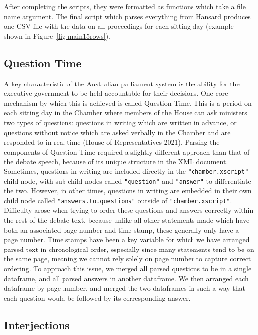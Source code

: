 \documentclass[
  letterpaper,
  DIV=11,
  numbers=noendperiod]{scrartcl}
\begin{document}
After completing the scripts, they were formatted as functions which
take a file name argument. The final script which parses everything from
Hansard produces one CSV file with the data on all proceedings for each
sitting day (example shown in Figure~\ref{fig-main15rows}).

\hypertarget{sec-qa}{%
\subsection{Question Time}\label{sec-qa}}

A key characteristic of the Australian parliament system is the ability
for the executive government to be held accountable for their decisions.
One core mechanism by which this is achieved is called Question Time.
This is a period on each sitting day in the Chamber where members of the
House can ask ministers two types of questions: questions in writing
which are written in advance, or questions without notice which are
asked verbally in the Chamber and are responded to in real time (House
of Representatives 2021). Parsing the components of Question Time
required a slightly different approach than that of the debate speech,
because of its unique structure in the XML document. Sometimes,
questions in writing are included directly in the
\texttt{"chamber.xscript"} child node, with sub-child nodes called
\texttt{"question"} and \texttt{"answer"} to differentiate the two.
However, in other times, questions in writing are embedded in their own
child node called \texttt{"answers.to.questions"} outside of
\texttt{"chamber.xscript"}. Difficulty arose when trying to order these
questions and answers correctly within the rest of the debate text,
because unlike all other statements made which have both an associated
page number and time stamp, these generally only have a page number.
Time stamps have been a key variable for which we have arranged parsed
text in chronological order, especially since many statements tend to be
on the same page, meaning we cannot rely solely on page number to
capture correct ordering. To approach this issue, we merged all parsed
questions to be in a single dataframe, and all parsed answers in another
dataframe. We then arranged each dataframe by page number, and merged
the two dataframes in such a way that each question would be followed by
its corresponding answer.

\hypertarget{sec-interject}{%
\subsection{Interjections}\label{sec-interject}}
\end{document}
